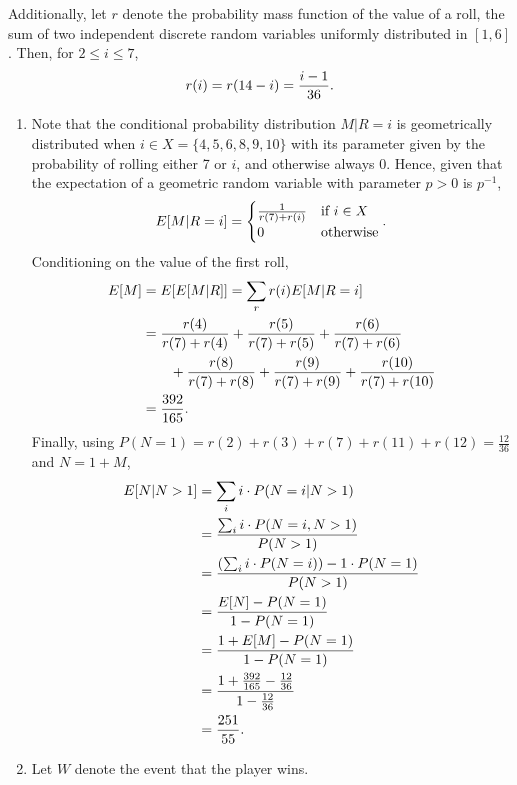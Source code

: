 \documentclass{article}
\begin{document}
\begin{enumerate}
    Additionally, let $r$ denote the probability mass function of the value of a roll, the sum of two independent discrete random variables uniformly distributed in $[1,6]$.
    Then, for $2 \leq i \leq 7$, $$r(i) = r(14-i) = \frac{i-1}{36}\text.$$
    \begin{enumerate}
    \item
        Note that the conditional probability distribution $M|R=i$ is geometrically distributed when $i \in X=\{4,5,6,8,9,10\}$ with its parameter given by
        the probability of rolling either 7 or $i$, and otherwise always $0$. Hence, given that the expectation of a geometric random variable with parameter
        $p>0$ is $p^{-1}$,
        \[
        E[M|R=i] =
        \begin{cases}
            \frac{1}{r(7) + r(i)}   & \text{if } i \in X \\
            0                       & \text{otherwise}
        \end{cases}\text.
        \]
    Conditioning on the value of the first roll,
    \[\begin{split}
    E[M]    & = E[E[M|R]] = \sum_r r(i) E[M|R=i] \\
            & = \frac{r(4)}{r(7)+r(4)} + \frac{r(5)}{r(7)+r(5)} + \frac{r(6)}{r(7)+r(6)} \\
            & \qquad + \frac{r(8)}{r(7)+r(8)} + \frac{r(9)}{r(7)+r(9)} + \frac{r(10)}{r(7)+r(10)} \\
            & = \frac{392}{165}\text.
    \end{split}\]
    Finally, using $P(N=1)=r(2)+r(3)+r(7)+r(11)+r(12)=\frac{12}{36}$ and $N=1+M$,
    \[\begin{split}
    E[N|N>1] & = \sum_i i\cdot P(N=i|N>1) \\
             & = \frac{\sum_i i\cdot P(N=i,N>1)}{P(N>1)} \\
             & = \frac{\left(\sum_i i\cdot P(N=i)\right) - 1\cdot P(N=1)}{P(N>1)} \\
             & = \frac{E[N] - P(N=1)}{1-P(N=1)} \\
             & = \frac{1 + E[M] - P(N=1)}{1-P(N=1)} \\
             & = \frac{1+\frac{392}{165}-\frac{12}{36}}{1-\frac{12}{36}} \\
             & = \frac{251}{55}\text.
    \end{split}\]
    \item
        Let $W$ denote the event that the player wins.


\end{enumerate}
\end{enumerate}
\end{document}
